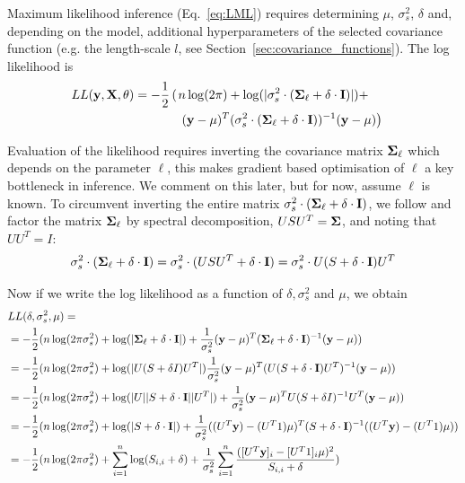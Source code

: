 Maximum likelihood inference (Eq.~\ref{eq:LML}) requires determining $ \mu $, $ \sigma_s^2 $, $ \delta $ and, depending on the model, additional hyperparameters of the selected covariance function (e.g. the length-scale $l$, see Section~\ref{sec:covariance_functions}). The log likelihood is 
\begin{align*}
LL({\bf y}, {\bf X}, \theta) =  -\frac{1}{2} \left( \right. &n \log (2 \pi) + \log (|\sigma_s^2 \cdot (\mbox{\boldmath $\Sigma$}_\ell + \delta \cdot {\bf I}) | ) + & \\
& \left. ({\bf y} - \mu)^T (\sigma_s^2 \cdot (\mbox{\boldmath $\Sigma$}_\ell + \delta \cdot {\bf I} ) )^{-1}  ({\bf y} - \mu) \right) &
\end{align*}

Evaluation of the likelihood requires inverting the covariance matrix \( \mbox{\boldmath $\Sigma$}_\ell \) which depends on the parameter \( \ell \), this makes gradient based optimisation of \( \ell \) a key bottleneck in inference. We comment on this later, but for now, assume \( \ell \) is known. To circumvent inverting the entire matrix \( \sigma_s^2 \cdot (\mbox{\boldmath $\Sigma$}_\ell + \delta \cdot {\bf I} )  \), we follow \cite{Lippert2011-fm} and factor the matrix \( \mbox{\boldmath $\Sigma$}_\ell \) by spectral decomposition, \( USU^T = \mbox{\boldmath $\Sigma$} \), and noting that \( UU^T = I \):
\begin{align*}
   \sigma_s^2 \cdot (\mbox{\boldmath $\Sigma$}_\ell + \delta \cdot {\bf I} ) =
   \sigma_s^2 \cdot (USU^T + \delta \cdot {\bf I} ) =
   \sigma^2_{s} \cdot U (S + \delta \cdot {\bf I}) U^T
\end{align*}

\begin{sloppypar}
Now if we write the log likelihood as a function of \( \delta, \sigma_s^2 \) and \( \mu \), we obtain
\begin{align*}
& LL(\delta, \sigma_s^2, \mu) = \\
&= -\frac{1}{2}( n \log (2 \pi \sigma_s^2 ) + \log (| \mbox{\boldmath $\Sigma$}_\ell + \delta \cdot {\bf I} |) +  \frac{1}{\sigma_s^2} ({\bf y} - \mu)^T (\mbox{\boldmath $\Sigma$}_\ell + \delta \cdot {\bf I})^{-1} ({\bf y} - \mu)) \\
&= -\frac{1}{2}( n \log (2 \pi \sigma_s^2 ) + \log (|U(S+\delta I)U^T|) \frac{1}{\sigma_s^2} ({\bf y} - \mu)^T (U(S + \delta \cdot {\bf I})U^T)^{-1} ({\bf y} - \mu)) \\
&= -\frac{1}{2}( n \log (2 \pi \sigma_s^2 ) + \log (|U||S + \delta \cdot {\bf I}||U^T|) + \frac{1}{\sigma_s^2} ({\bf y} - \mu)^T U (S + \delta I)^{-1} U^T ({\bf y} - \mu)) \\
&= -\frac{1}{2}( n \log (2 \pi \sigma_s^2 ) + \log (|S + \delta \cdot {\bf I}|) + \frac{1}{\sigma_s^2} ((U^T{\bf y}) - (U^T1)\mu)^T (S + \delta \cdot {\bf I})^{-1} ( (U^T{\bf y}) - (U^T1) \mu)) \\
&= -\frac{1}{2}(n \log (2 \pi \sigma_s^2) + \sum_{i=1}^n \log (S_{i,i} + \delta) + \frac{1}{\sigma_s^2} \sum_{i=1}^n \frac{([U^T{\bf y}]_i - [U^T1]_i \mu)^2}{S_{i,i} + \delta})
\end{align*}
\end{sloppypar}

